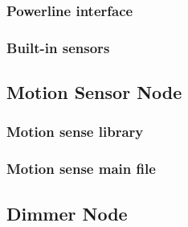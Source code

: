 \subsubsection{Powerline interface}



\subsubsection{Built-in sensors}



\pagebreak


\subsection{Motion Sensor Node}
\label{an:motion-code}

\subsubsection{Motion sense library}



\subsubsection{Motion sense main file}


\pagebreak

\subsection{Dimmer Node}
\label{an:dimmer-code}

